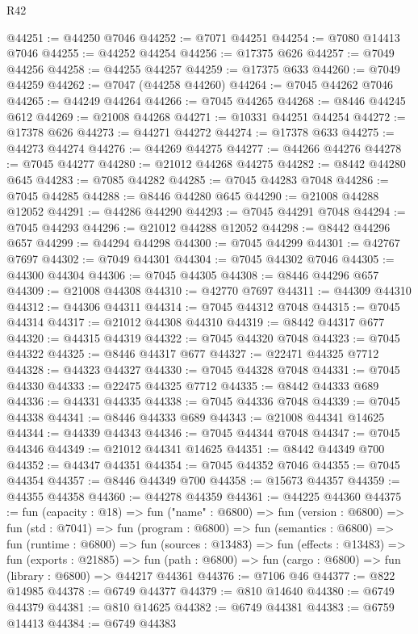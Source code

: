 \begin{lexlean}{R42}
\begin{coremodule}
{@44251 := @44250 @7046
@44252 := @7071 @44251
@44254 := @7080 @14413 @7046
@44255 := @44252 @44254
@44256 := @17375 @626
@44257 := @7049 @44256
@44258 := @44255 @44257
@44259 := @17375 @633
@44260 := @7049 @44259
@44262 := @7047 (@44258 @44260)
@44264 := @7045 @44262 @7046
@44265 := @44249 @44264
@44266 := @7045 @44265
@44268 := @8446 @44245 @612
@44269 := @21008 @44268
@44271 := @10331 @44251 @44254
@44272 := @17378 @626
@44273 := @44271 @44272
@44274 := @17378 @633
@44275 := @44273 @44274
@44276 := @44269 @44275
@44277 := @44266 @44276
@44278 := @7045 @44277
@44280 := @21012 @44268 @44275
@44282 := @8442 @44280 @645
@44283 := @7085 @44282
@44285 := @7045 @44283 @7048
@44286 := @7045 @44285
@44288 := @8446 @44280 @645
@44290 := @21008 @44288 @12052
@44291 := @44286 @44290
@44293 := @7045 @44291 @7048
@44294 := @7045 @44293
@44296 := @21012 @44288 @12052
@44298 := @8442 @44296 @657
@44299 := @44294 @44298
@44300 := @7045 @44299
@44301 := @42767 @7697
@44302 := @7049 @44301
@44304 := @7045 @44302 @7046
@44305 := @44300 @44304
@44306 := @7045 @44305
@44308 := @8446 @44296 @657
@44309 := @21008 @44308
@44310 := @42770 @7697
@44311 := @44309 @44310
@44312 := @44306 @44311
@44314 := @7045 @44312 @7048
@44315 := @7045 @44314
@44317 := @21012 @44308 @44310
@44319 := @8442 @44317 @677
@44320 := @44315 @44319
@44322 := @7045 @44320 @7048
@44323 := @7045 @44322
@44325 := @8446 @44317 @677
@44327 := @22471 @44325 @7712
@44328 := @44323 @44327
@44330 := @7045 @44328 @7048
@44331 := @7045 @44330
@44333 := @22475 @44325 @7712
@44335 := @8442 @44333 @689
@44336 := @44331 @44335
@44338 := @7045 @44336 @7048
@44339 := @7045 @44338
@44341 := @8446 @44333 @689
@44343 := @21008 @44341 @14625
@44344 := @44339 @44343
@44346 := @7045 @44344 @7048
@44347 := @7045 @44346
@44349 := @21012 @44341 @14625
@44351 := @8442 @44349 @700
@44352 := @44347 @44351
@44354 := @7045 @44352 @7046
@44355 := @7045 @44354
@44357 := @8446 @44349 @700
@44358 := @15673 @44357
@44359 := @44355 @44358
@44360 := @44278 @44359
@44361 := @44225 @44360
@44375 := fun (capacity : @18) =>
  fun ("name" : @6800) =>
  fun (version : @6800) =>
  fun (std : @7041) =>
  fun (program : @6800) =>
  fun (semantics : @6800) =>
  fun (runtime : @6800) =>
  fun (sources : @13483) =>
  fun (effects : @13483) =>
  fun (exports : @21885) =>
  fun (path : @6800) => fun (cargo : @6800) => fun (library : @6800) => @44217 @44361
@44376 := @7106 @46
@44377 := @822 @14985
@44378 := @6749 @44377
@44379 := @810 @14640
@44380 := @6749 @44379
@44381 := @810 @14625
@44382 := @6749 @44381
@44383 := @6759 @14413
@44384 := @6749 @44383
}
\end{coremodule}
\end{lexlean}
